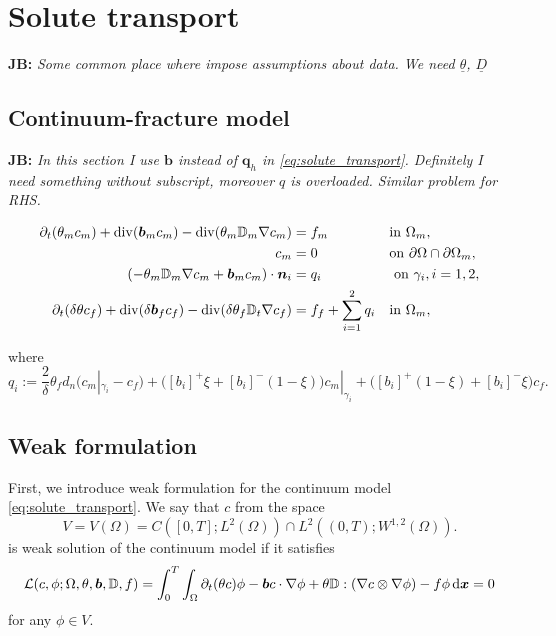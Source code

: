 \documentclass[a4paper]{article}
\def\prtl{\partial}
\def\vc#1{\mathbf{\boldsymbol{#1}}}     %
\def\tn#1{{\mathbb{#1}}}    %
\def\div{{\rm div}}
\def\grad{\nabla}
\def\d {\,{\rm d}}
\def\ul{\underline}
\newcommand{\note}[2]{{\color{blue} \textbf{ #1:} \textit{#2}}}
\begin{document}
\section{Solute transport}
\note{JB}{Some common place where impose assumptions about data. We need $\ul{\theta}$, $\ul{D}$}
\subsection{Continuum-fracture model}
\note{JB}{In this section I use $\vc b$ instead of $\vc q_h$ in \eqref{eq:solute_transport}. Definitely I need something without subscript, moreover $q$ is overloaded.
Similar problem for RHS.}

\begin{subequations}
 
\label{eq:fr:solute}
\begin{align}
  \label{eq:fr:solute:main}
  \prtl_t (\theta_m c_m) + \div(\vc b_m c_m) - \div(\theta_m \tn D_m \grad c_m) &= f_m&&  \text{in } \Omega_m,\\
  \label{eq:fr:solute:bc}
  c_m &= 0&& \text{on } \partial\Omega\cap\partial\Omega_m,\\
  (- \theta_m \tn D_m\grad c_m + \vc b_m c_m) \cdot \vc n_i &= q_i &&\mbox{ on }\gamma_i,i=1,2,\\ 
  \prtl_t(\delta\theta c_f)  + \div(\delta \vc b_f c_f ) - \div( \delta \theta_f \tn D_t \grad c_f) 
      &= f_f + \sum_{i=1}^2 q_i&&  \text{in } \Omega_m,\\
\end{align}
\end{subequations}

where 
\begin{equation}
    \label{eq:fr:flux12}
    q_i:=\frac2\delta \theta_f d_n(c_m|_{\gamma_i} - c_f) 
    +  \big([b_i]^{+}\xi + [b_i]^{-}(1-\xi)\big) c_m|_{\gamma_i}
    +  \big([b_i]^{+}(1-\xi) + [b_i]^{-}\xi\big) c_f.
\end{equation}

\subsection{Weak formulation}
First, we introduce weak formulation for the continuum model \eqref{eq:solute_transport}.
We say that $c$ from the space 
\[
    V= V(\Omega) =C([0,T]; L^2(\Omega) ) \cap L^2( (0,T); W^{1,2}(\Omega) ).
\]    
is weak solution of the continuum model if it satisfies
\begin{equation}
    \label{eq:solute_weak}
    \mathcal L (c, \phi; \Omega, \theta, \vc b, \tn D, f) = \int_0^T \int_{\Omega} \prtl_t(\theta c)\phi - \vc b c \cdot \grad \phi 
        + \theta \tn D : (\grad c \otimes \grad \phi) - f\phi \d \vc x =0\\
\end{equation}
for any $\phi \in V$. 
\end{document}
